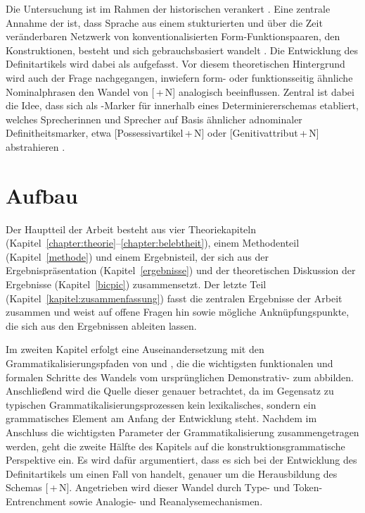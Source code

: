 Die Untersuchung ist im Rahmen der historischen  verankert \parencite[s. u.a.][]{Traugott2003,Bergs2008,Traugott2013}. Eine zentrale Annahme der  ist, dass Sprache aus einem stukturierten und über die Zeit veränderbaren Netzwerk  von konventionalisierten Form-Funktionspaaren, den Konstruktionen,  besteht und sich gebrauchsbasiert wandelt \parencite{Bybee2010,Bybee2013}. Die Entwicklung des Definitartikels  wird dabei als  aufgefasst. Vor diesem theoretischen Hintergrund wird auch der Frage nachgegangen, inwiefern form- oder funktionsseitig ähnliche Nominalphrasen  den Wandel von [\,+\,N] analogisch  beeinflussen. Zentral ist dabei die Idee, dass sich  als -Marker für  innerhalb eines Determiniererschemas   etabliert, welches Sprecherinnen und Sprecher auf Basis ähnlicher adnominaler Definitheitsmarker, etwa  [Possessivartikel\,+\,N]   oder [Genitivattribut\,+\,N]  abstrahieren \parencite[vgl. für das Englische][]{Sommerer2015}.

\section{Aufbau} 

Der Hauptteil der Arbeit besteht aus vier Theoriekapiteln  (Kapitel~\ref{chapter:theorie}--\ref{chapter:belebtheit}), einem Methodenteil (Kapitel~\ref{methode}) und einem Ergebnisteil, der sich aus der Ergebnispräsentation (Kapitel~\ref{ergebnisse}) und der theoretischen Diskussion der Ergebnisse (Kapitel~\ref{bicpic}) zusammensetzt. Der letzte Teil (Kapitel~\ref{kapitel:zusammenfassung}) fasst die zentralen Ergebnisse der Arbeit zusammen und weist auf offene Fragen hin sowie mögliche Anknüpfungspunkte, die sich aus den Ergebnissen ableiten lassen. 

Im zweiten Kapitel erfolgt eine Auseinandersetzung mit den Grammatikalisierungspfaden  von \textcite{Greenberg1978} und \textcite{Lehmann2015}, die die wichtigsten funktionalen und formalen Schritte des Wandels vom ursprünglichen Demonstrativ-  zum  abbilden. Anschließend wird die Quelle dieser 
 genauer betrachtet, da im Gegensatz zu typischen Grammatikalisierungsprozessen  kein lexikalisches, sondern ein grammatisches Element am Anfang der Entwicklung steht. Nachdem im Anschluss die wichtigsten Parameter der Grammatikalisierung zusammengetragen werden, geht die zweite Hälfte des Kapitels auf die konstruktionsgrammatische Perspektive  ein. Es wird dafür argumentiert, dass es sich bei der Entwicklung des Definitartikels  um einen Fall von 
 handelt, genauer um die Herausbildung des Schemas  [\,+\,N]. Angetrieben wird dieser Wandel durch Type- und Token-Entrenchment   sowie Analogie- und Reanalysemechanismen.   

